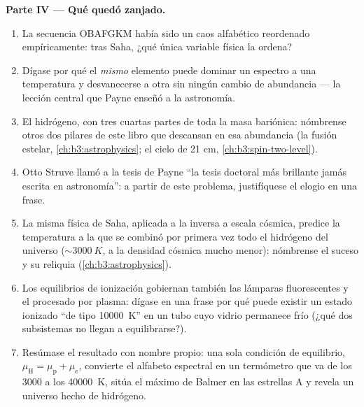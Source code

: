 \begin{problem}
\medskip\noindent\textbf{Parte IV --- Qué quedó zanjado.}
\begin{enumerate}[resume]
  \item La secuencia OBAFGKM había sido un caos alfabético
        reordenado empíricamente: tras Saha, ¿qué única variable física
        la ordena?
  \item Dígase por qué el \emph{mismo} elemento puede dominar un
        espectro a una temperatura y desvanecerse a otra sin ningún
        cambio de abundancia --- la lección central que Payne enseñó a la
        astronomía.
  \item El hidrógeno, con tres cuartas partes de toda la masa bariónica:
        nómbrense otros dos pilares de este libro que descansan en esa
        abundancia (la fusión estelar, \cref{ch:b3:astrophysics}; el cielo
        de 21 cm, \cref{ch:b3:spin-two-level}).
  \item Otto Struve llamó a la tesis de Payne ``la tesis doctoral más
        brillante jamás escrita en astronomía'': a partir de este
        problema, justifíquese el elogio en una frase.
  \item La misma física de Saha, aplicada a la inversa a escala cósmica,
        predice la temperatura a la que se combinó por primera vez todo el
        hidrógeno del universo ($\sim\qty{3000}{K}$, a la densidad cósmica
        mucho menor): nómbrense el suceso y su reliquia
        (\cref{ch:b3:astrophysics}).
  \item Los equilibrios de ionización gobiernan también las lámparas
        fluorescentes y el procesado por plasma: dígase en una frase por qué
        puede existir un estado ionizado ``de tipo \qty{10000}{K}'' en un
        tubo cuyo vidrio permanece frío (¿qué dos subsistemas no llegan a
        equilibrarse?).
  \item Resúmase el resultado con nombre propio: una sola condición de
        equilibrio, $\mu_{\text{H}} = \mu_{\text{p}} + \mu_{\text{e}}$,
        convierte el alfabeto espectral en un termómetro que va de los
        $3000$ a los \qty{40000}{K}, sitúa el máximo de Balmer en las
        estrellas A y revela un universo hecho de hidrógeno.
\end{enumerate}
\end{problem}
